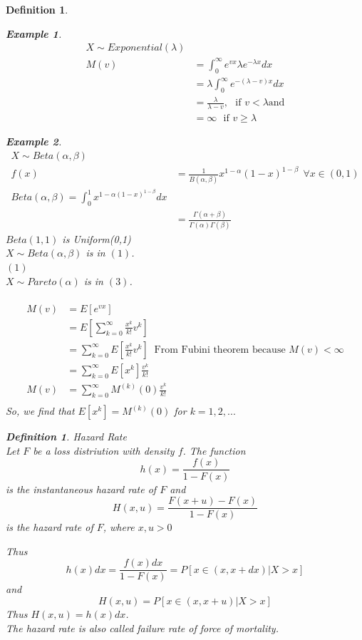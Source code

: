 \documentclass[11pt,a4paper,oneside]{article}\usepackage[]{graphicx}\usepackage[]{color}
\newtheorem{defi}[subsection]{Definition}
\newtheorem{exm}{Example}
\begin{document}
\begin{algin*}
\begin{defi}
\begin{exm}
\begin{align*}X\sim Exponential(\lambda)\\
M(v)&=\displaystyle\int_0^{\infty}e^{vx}\lambda e^{-\lambda x}dx\\
&=\lambda\int_0^{\infty}e^{-(\lambda-v)x}dx\\
&=\frac{\lambda}{\lambda-v},\ \ \ \text{if }  v<\lambda \text{and}\\
&=\infty\ \ \ \text{if } v\geq \lambda
\end{align*}
\end{exm}


\begin{exm}
\begin{align*}X\sim Beta(\alpha,\beta)\\
f(x)&=\frac{1}{B(\alpha,\beta)}x^{1-\alpha}(1-x)^{1-\beta}\ \ \forall x\in (0,1)\\
Beta(\alpha,\beta)=\int_0^1x^{1-\alpha(1-x)^{1-\beta}}dx\\
&=\frac{\Gamma(\alpha+\beta)}{\Gamma(\alpha)\Gamma(\beta)}
\end{align*}
$Beta(1,1)$ is Uniform(0,1)\\
$X\sim Beta(\alpha,\beta)$ is in $(1)$.\\
$(1)$\\
$X\sim Pareto(\alpha)$ is in $(3)$.\\
\\
\begin{align*}
M(v)&=E[e^{vx}]\\
    &=E[\displaystyle\sum_{k=0}^{\infty}\frac{x^k}{k!}v^k]\\
    &=\displaystyle\sum_{k=0}^{\infty}E[\frac{x^k}{k!}v^k]\ \text{ From Fubini theorem because $M(v)<\infty$}\\
    &=\displaystyle\sum_{k=0}^{\infty}E[x^k]\frac{v^k}{k!}\\
M(v)&=\displaystyle\sum_{k=0}^{\infty}  M^{(k)}(0)\frac{v^k}{k!}\\
\end{align*}
So, we find that $E[x^k]=M^{(k)}(0)$ for $k=1,2,...$
\end{exm}



\begin{defi}Hazard Rate\\
Let $F$ be a loss distriution with density $f$. The function $$h(x)=\frac{f(x)}{1-F(x)}$$ is the instantaneous hazard rate of $F$ and $$H(x,u)=\frac{F(x+u)-F(x)}{1-F(x)}$$ is the hazard rate of $F$, where $x,u>0$
\end{defi}
Thus $$h(x)dx=\frac{f(x)dx}{1-F(x)}=P[x\in(x,x+dx)|X>x]$$ and 
$$H(x,u)=P[x\in(x,x+u)|X>x]$$
Thus $H(x,u)=h(x)dx$.\\
The hazard rate is also called failure rate of force of mortality.\\


\end{defi}
\end{algin*}
\end{document}
